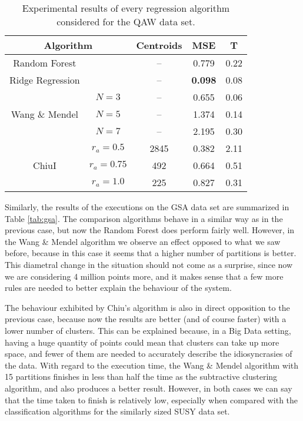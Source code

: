 \begin{table}[h!]
\centering
\caption{Experimental results of every regression algorithm considered for the QAW data set.}
\label{tab:qaw}
\begin{tabular}{ccccc}
\toprule
\multicolumn{2}{c}{Algorithm} & Centroids & MSE & T\\ \midrule
  Random Forest & & -- & 0.779 & 0.22 \\
  Ridge Regression & & -- & \textbf{0.098} &0.08\\
 \multirow{3}{*}{Wang \& Mendel} & $N=3$ & -- & 0.655 & 0.06\\
  & $N=5$ & -- & 1.374 & 0.14\\
  & $N=7$ & -- & 2.195 & 0.30\\
 \multirow{3}{*}{ChiuI} & $r_a=0.5$ &  2845 & 0.382 & 2.11\\
  & $r_a=0.75$ &  492 & 0.664 & 0.51\\
  & $r_a=1.0$ &  225 & 0.827 & 0.31\\ \bottomrule
\end{tabular}
\end{table}

Similarly, the results of the executions on the GSA data set are summarized in Table \ref{tab:gsa}. The comparison algorithms behave in a similar way as in the previous case, but now the Random Forest does perform fairly well. However, in the Wang \& Mendel algorithm we observe an effect opposed to what we saw before, because in this case it seems that a higher number of partitions is better. This diametral change in the situation should not come as a surprise, since now we are considering 4 million points more, and it makes sense that a few more rules are needed to better explain the behaviour of the system.

The behaviour exhibited by Chiu's algorithm is also in direct opposition to the previous case, because now the results are better (and of course faster) with a lower number of clusters. This can be explained because, in a Big Data setting, having a huge quantity of points could mean that clusters can take up more space, and fewer of them are needed to accurately describe the idiosyncrasies of the data. With regard to the execution time, the Wang \& Mendel algorithm with 15 partitions finishes in less than half the time as the subtractive clustering algorithm, and also produces a better result. However, in both cases we can say that the time taken to finish is relatively low, especially when compared with the classification algorithms for the similarly sized SUSY data set.

